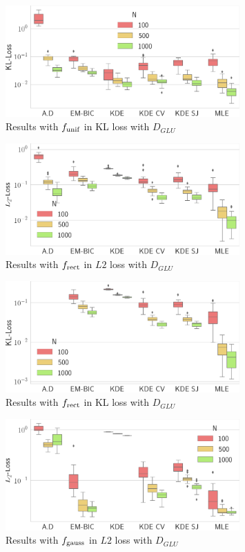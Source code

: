 \begin{figure}
\center
    \includegraphics[width=0.8\textwidth]{./TeX_files/res_uniform_KL_GLU.png}
    \caption{Results with $f_{\textnormal{unif}}$ in KL loss with $D_{GLU}$}
    \label{fig:res_uniform_KL_GLU}
\end{figure}
\begin{figure}
\center
    \includegraphics[width=0.8\textwidth]{./TeX_files/res_rect_L2_GLU.png}
    \caption{Results with $f_{\textnormal{rect}}$ in $L2$ loss with $D_{GLU}$}
    \label{fig:res_rect_L2_GLU}
\end{figure}

\begin{figure}
\center
    \includegraphics[width=0.8\textwidth]{./TeX_files/res_rect_KL_GLU.png}
    \caption{Results with $f_{\textnormal{rect}}$ in KL loss with $D_{GLU}$}
    \label{fig:res_rect_KL_GLU}
\end{figure}
\begin{figure}
\center
    \includegraphics[width=0.8\textwidth]{./TeX_files/res_gauss_L2_GLU.png}
    \caption{Results with $f_{\textnormal{gauss}}$ in $L2$ loss with $D_{GLU}$}
    \label{fig:res_gauss_L2_GLU}
\end{figure}

